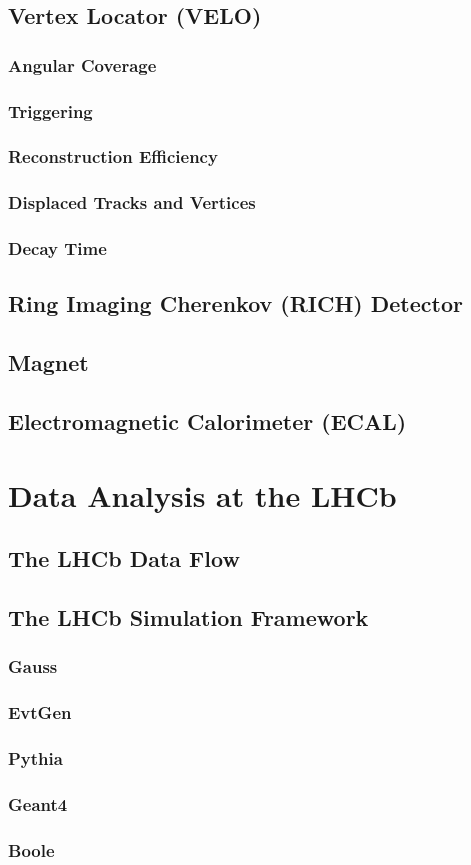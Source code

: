 \subsection{Vertex Locator (VELO)}
\subsubsection{Angular Coverage}
\subsubsection{Triggering}
\subsubsection{Reconstruction Efficiency}
\subsubsection{Displaced Tracks and Vertices}
\subsubsection{Decay Time}
\subsection{Ring Imaging Cherenkov (RICH) Detector}
\subsection{Magnet} 
\subsection{Electromagnetic Calorimeter (ECAL)}
\section{Data Analysis at the LHCb}
\subsection{The LHCb Data Flow}
\subsection{The LHCb Simulation Framework}
\subsubsection{Gauss}
\subsubsection{EvtGen}
\subsubsection{Pythia}
\subsubsection{Geant4}
\subsubsection{Boole} 



